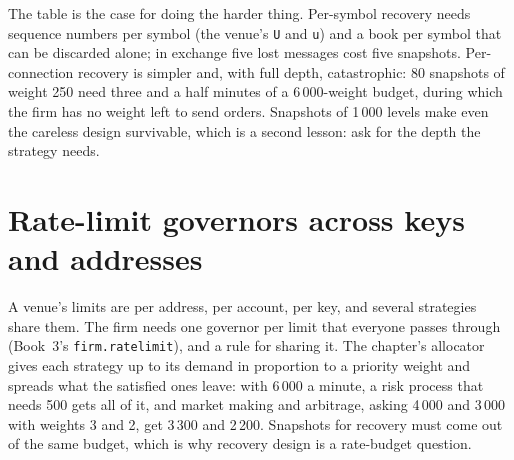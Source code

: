 \begin{omfigure}

\label{fig:nw:api-engineering-for-crypto-venues:stale}
\end{omfigure}

The table is the case for doing the harder thing. Per-symbol recovery needs sequence numbers per symbol (the venue's \texttt{U} and \texttt{u}) and a
book per symbol that can be discarded alone; in exchange five lost messages cost five snapshots. Per-connection recovery is simpler and, with full
depth, catastrophic: 80 snapshots of weight 250 need three and a half minutes of a 6\,000-weight budget, during which the firm has no weight left to
send orders. Snapshots of 1\,000 levels make even the careless design survivable, which is a second lesson: ask for the depth the strategy needs.

\section{Rate-limit governors across keys and addresses}

A venue's limits are per address, per account, per key, and several strategies share them. The firm needs one governor per limit that everyone
passes through (Book~3's \texttt{firm.ratelimit}), and a rule for sharing it. The chapter's allocator gives each strategy up to its demand in
proportion to a priority weight and spreads what the satisfied ones leave: with 6\,000 a minute, a risk process that needs 500 gets all of it, and
market making and arbitrage, asking 4\,000 and 3\,000 with weights 3 and 2, get 3\,300 and 2\,200. Snapshots for recovery must come out of the same
budget, which is why recovery design is a rate-budget question.

